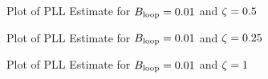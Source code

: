 \documentclass{article}
\begin{document}
\begin{figure}[H]
	\centerline{}
	\caption{Plot of PLL Estimate for $\protect{B_\text{loop}} = 0.01$ and $\protect{\zeta = 0.5}$}
	\label{fig::convergence_Bloop_0p01_damp_0p5}
\end{figure}

\begin{figure}[H]
	\centerline{}
	\caption{Plot of PLL Estimate for $\protect{B_\text{loop}} = 0.01$ and $\protect{\zeta = 0.25}$}
	\label{fig::convergence_Bloop_0p01_damp_0p25}
\end{figure}

\begin{figure}[H]
	\centerline{}
	\caption{Plot of PLL Estimate for $\protect{B_\text{loop}} = 0.01$ and $\protect{\zeta = 1}$}
	\label{fig::convergence_Bloop_0p01_damp_1}
\end{figure}
\end{document}
